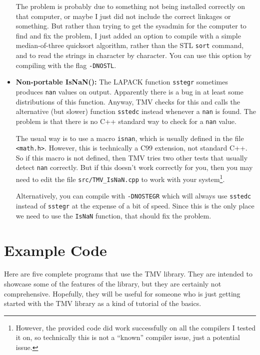 \documentclass[twoside,letterpaper,11pt]{article}
\renewcommand{\tt}[1]{{\lstinline {#1}}}
\begin{document}
\begin{itemize}
The problem is probably due to something not being installed correctly on that
computer, or maybe I just did not include the correct linkages or something.  
But rather than trying to get the sysadmin for the computer to find and fix the problem, 
I just added an option to compile with a simple median-of-three
quicksort algorithm, rather than the STL \tt{sort} command, and to read the strings
in character by character.  You can use this option by compiling with the 
flag \texttt{-DNOSTL}.  

\item {\bf Non-portable IsNaN():}
The LAPACK function \tt{sstegr} sometimes produces \tt{nan} values on output.
Apparently there is a bug in at least some distributions of this function.
Anyway, TMV checks for this and calls the alternative (but slower) function
\tt{sstedc} instead whenever a \tt{nan} is found.  
The problem is that there is no C++ standard way to check
for a \tt{nan} value.  

The usual way is to use a macro \tt{isnan}, which is usually
defined in the file \tt{<math.h>}.  However, this is technically a C99 extension,
not standard C++.  So if this macro is not defined, then TMV tries two other
tests that usually detect \tt{nan} correctly.  But if this doesn't work correctly
for you, then you may need to edit the file \texttt{src/TMV\_IsNaN.cpp} to work
with your system\footnote{
However, the provided code did work successfully on all the compilers I 
tested it on, so technically this is not a ``known'' compiler issue, just a 
potential issue.}.

Alternatively, you can compile with \texttt{-DNOSTEGR} which will always
use \tt{sstedc} instead of \tt{sstegr} at the expense of a bit of speed.
Since this is the only place we need to use the \tt{IsNaN} function, that 
should fix the problem.

\end{itemize}


\newpage
\section{Example Code}

Here are five complete programs that use the TMV library.  They are intended to showcase
some of the features of the library, but they are certainly not comprehensive.  Hopefully,
they will be useful for someone who is just getting started with the TMV library as a 
kind of tutorial of the basics.
\end{document}
